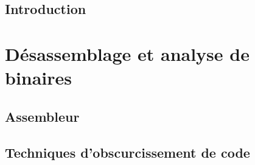 
\WritePartLabelInToc
\WriteChapterLabelInToc


{}
\setcounter{tocdepth}{2}
\tableofcontents





\DontWriteThisInToc   
\listoffigures


\mainmatter

\DontFrameThisInToc
\NumberThisInToc
\chapter{Introduction}


\part{Désassemblage et analyse de binaires}

\DontFrameThisInToc
\chapter{Assembleur}


\DontFrameThisInToc
\chapter{Techniques d'obscurcissement de code}


